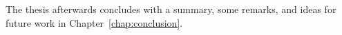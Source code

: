 The thesis afterwards concludes with a summary, some remarks, and ideas for future work in Chapter~\ref{chap:conclusion}.













